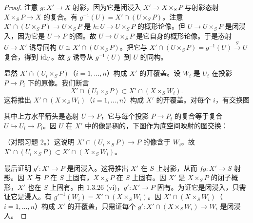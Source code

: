 \begin{proof}
注意 $g\colon X'\to X$ 射影，因为它是闭浸入 $X'\to X\times_S P$ 与射影态射 $X\times_S P\to X$ 的复合。有 $g^{-1}(U)=X'\cap(U\times_S P)$。注意 $X'\cap(U\times_S P)\to U\times_S P$ 是 $h\colon U\to U\times_S P$ 的概形论像。但 $U\to U\times_S P$ 是闭浸入，因为它是 $U\to P$ 的图。故 $U\to U\times_S P$ 是它自身的概形论像。于是态射 $U\to X'$ 诱导同构 $U\cong X'\cap(U\times_S P)$。把它与 $X'\cap(U\times_S P)=g^{-1}(U)\xrightarrow{g}U$ 复合，得到 $\operatorname{id}_U$。故 $g$ 诱导从 $g^{-1}(U)$ 到 $U$ 的同构。

显然 $X'\cap(U_i\times_S P)$（$i=1,\dots,n$）构成 $X'$ 的开覆盖。设 $W_i$ 是 $U_i$ 在投影 $P\to P_i$ 下的原像。我们断言
\[
X'\cap(U_i\times_S P)\subset X'\cap(X\times_S W_i).
\]
这将推出 $X'\cap(X\times_S W_i)$（$i=1,\dots,n$）构成 $X'$ 的开覆盖。对每个 $i$，有交换图
\begin{center}
\end{center}
其中上方水平箭头是态射 $U\to P$，它与每个投影 $P\to P_i$ 的复合等于复合 $U\hookrightarrow U_i\to P_i$。因 $U$ 在 $X'$ 中的像是稠的，下图作为底空间映射的图交换：
\begin{center}
\end{center}
（对照习题 2。）这说明 $X'\cap(U_i\times_S P)\to P$ 的像含于 $W_i$。故 $X'\cap(U_i\times_S P)\subset X'\cap(X\times_S W_i)$。

最后证明 $g'\colon X'\to P$ 是闭浸入。这将推出 $X'$ 在 $S$ 上射影，从而 $fg\colon X'\to S$ 射影。因 $X$ 与 $P$ 在 $S$ 上固有，$X\times_S P$ 在 $S$ 上固有。因 $X'$ 是 $X\times_S P$ 的闭子概形，$X'$ 也在 $S$ 上固有。由 1.3.26 (vi)，$g'\colon X'\to P$ 固有。为证它是闭浸入，只需证它是浸入。有 $g'^{-1}(W_i)=X'\cap(X\times_S W_i)$。因 $X'\cap(X\times_S W_i)$（$i=1,\dots,n$）构成 $X'$ 的开覆盖，只需证每个 $g'\colon X'\cap(X\times_S W_i)\to W_i$ 是闭浸入。


\end{proof}
